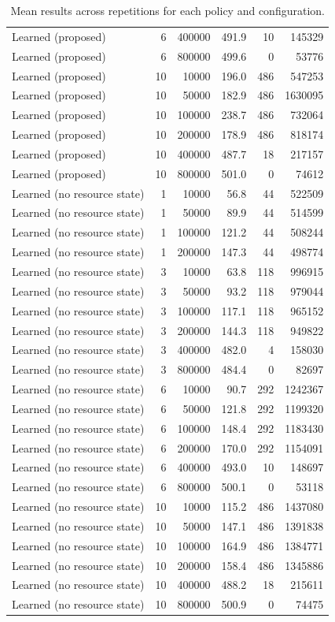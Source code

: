 \begin{table}[h]
\begin{tabular}{@{}lrrrrr@{}}
Learned (proposed) & 6 & 400000 & 491.9 & 10 & 145329 \\
Learned (proposed) & 6 & 800000 & 499.6 & 0 & 53776 \\
Learned (proposed) & 10 & 10000 & 196.0 & 486 & 547253 \\
Learned (proposed) & 10 & 50000 & 182.9 & 486 & 1630095 \\
Learned (proposed) & 10 & 100000 & 238.7 & 486 & 732064 \\
Learned (proposed) & 10 & 200000 & 178.9 & 486 & 818174 \\
Learned (proposed) & 10 & 400000 & 487.7 & 18 & 217157 \\
Learned (proposed) & 10 & 800000 & 501.0 & 0 & 74612 \\
Learned (no resource state) & 1 & 10000 & 56.8 & 44 & 522509 \\
Learned (no resource state) & 1 & 50000 & 89.9 & 44 & 514599 \\
Learned (no resource state) & 1 & 100000 & 121.2 & 44 & 508244 \\
Learned (no resource state) & 1 & 200000 & 147.3 & 44 & 498774 \\
Learned (no resource state) & 3 & 10000 & 63.8 & 118 & 996915 \\
Learned (no resource state) & 3 & 50000 & 93.2 & 118 & 979044 \\
Learned (no resource state) & 3 & 100000 & 117.1 & 118 & 965152 \\
Learned (no resource state) & 3 & 200000 & 144.3 & 118 & 949822 \\
Learned (no resource state) & 3 & 400000 & 482.0 & 4 & 158030 \\
Learned (no resource state) & 3 & 800000 & 484.4 & 0 & 82697 \\
Learned (no resource state) & 6 & 10000 & 90.7 & 292 & 1242367 \\
Learned (no resource state) & 6 & 50000 & 121.8 & 292 & 1199320 \\
Learned (no resource state) & 6 & 100000 & 148.4 & 292 & 1183430 \\
Learned (no resource state) & 6 & 200000 & 170.0 & 292 & 1154091 \\
Learned (no resource state) & 6 & 400000 & 493.0 & 10 & 148697 \\
Learned (no resource state) & 6 & 800000 & 500.1 & 0 & 53118 \\
Learned (no resource state) & 10 & 10000 & 115.2 & 486 & 1437080 \\
Learned (no resource state) & 10 & 50000 & 147.1 & 486 & 1391838 \\
Learned (no resource state) & 10 & 100000 & 164.9 & 486 & 1384771 \\
Learned (no resource state) & 10 & 200000 & 158.4 & 486 & 1345886 \\
Learned (no resource state) & 10 & 400000 & 488.2 & 18 & 215611 \\
Learned (no resource state) & 10 & 800000 & 500.9 & 0 & 74475 \\
\bottomrule
\end{tabular}
\caption{Mean results across repetitions for each policy and configuration.}
\label{tab:results}
\end{table}
